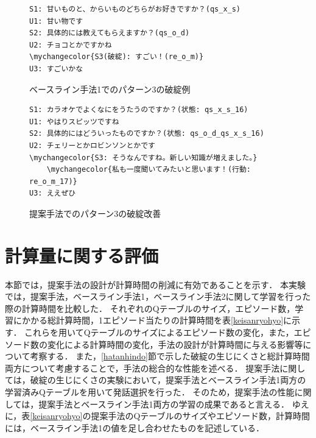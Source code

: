 \documentclass[12pt,a4paper,twoside,openany]{jbook}
\newcommand\mychangecolor[1]{\textcolor[rgb]{1,0,0}{\textbf{#1}}}
\begin{document}
\begin{figure}[tb]
\centering\label{baselinepattern3}
\begin{screen}
\begin{Verbatim}[commandchars=\\\{\}]
S1: 甘いものと、からいものどちらがお好きですか？(qs_x_s)
U1: 甘い物です
S2: 具体的には教えてもらえますか？(qs_o_d)
U2: チョコとかですかね
\mychangecolor{S3(破綻): すごい！(re_o_m)}
U3: すごいかな
\end{Verbatim}
\end{screen}
\caption{ベースライン手法1でのパターン3の破綻例}
\end{figure}

\begin{figure}[tb]
\centering\label{teianpattern3}
\begin{screen}
\begin{Verbatim}[commandchars=\\\{\}]
S1: カラオケでよくなにをうたうのですか？(状態: qs_x_s_16)
U1: やはりスピッツですね
S2: 具体的にはどういったものですか？(状態: qs_o_d_qs_x_s_16)
U2: チェリーとかロビンソンとかです
\mychangecolor{S3: そうなんですね。新しい知識が増えました。}
    \mychangecolor{私も一度聞いてみたいと思います！(行動: re_o_m_17)}
U3: ええぜひ
\end{Verbatim}
\end{screen}
\caption{提案手法でのパターン3の破綻改善}
\end{figure}

\section{計算量に関する評価}\label{keisanryo}
本節では，提案手法の設計が計算時間の削減に有効であることを示す．
本実験では，提案手法，ベースライン手法1，ベースライン手法2に関して学習を行った際の計算時間を比較した．
それぞれのQテーブルのサイズ，エピソード数，学習にかかる総計算時間，1エピソード当たりの計算時間を表\ref{keisanryohyo}に示す．
これらを用いてQテーブルのサイズによるエピソード数の変化，また，エピソード数の変化による計算時間の変化，手法の設計が計算時間に与える影響等について考察する．
また，\ref{hatanhindo}節で示した破綻の生じにくさと総計算時間両方について考慮することで，手法の総合的な性能を述べる．
提案手法に関しては，破綻の生じにくさの実験において，提案手法とベースライン手法1両方の学習済みQテーブルを用いて発話選択を行った．
そのため，提案手法の性能に関しては，提案手法とベースライン手法1両方の学習の成果であると言える．
ゆえに，表\ref{keisanryohyo}の提案手法のQテーブルのサイズやエピソード数，計算時間には，ベースライン手法1の値を足し合わせたものを記述している．
\end{document}
